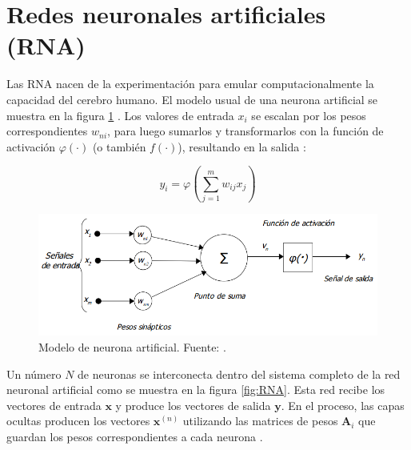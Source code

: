 \section{Redes neuronales artificiales (RNA)}

Las RNA nacen de la experimentación para emular computacionalmente la capacidad del cerebro humano. El modelo usual de una neurona artificial se muestra en la figura \ref{fig:neurona} \cite{RNACaravaca}. Los valores de entrada $x_i$ se escalan por los pesos correspondientes $w_{ni}$, para luego sumarlos y transformarlos con la función de activación $\varphi(\cdot)$ (o también $f(\cdot)$), resultando en la salida \cite{RNACaravaca}:

\begin{equation}
y_i = \varphi \left(\sum^m_{j=1} w_{ij} x_j \right)
\label{ecu:neurona}
\end{equation}

\begin{figure}[h]
	\centering
	\includegraphics[scale=0.55]{fig/new/NeuronaRNA.png}
	\caption{Modelo de neurona artificial. Fuente: \cite{RNACaravaca}.}
	\label{fig:neurona}
\end{figure}

Un número $N$ de neuronas se interconecta dentro del sistema completo de la red neuronal artificial como se muestra en la figura \ref{fig:RNA}. Esta red recibe los vectores de entrada $\mathbf{x}$ y produce los vectores de salida $\mathbf{y}$. En el proceso, las capas ocultas producen los vectores $\mathbf{x}^{(n)}$ utilizando las matrices de pesos $\mathbf{A}_i$ que guardan los pesos correspondientes a cada neurona \cite{RNACaravaca} \cite{DataScience}.

